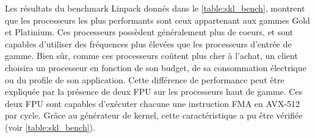         
        \begin{table}[h!]
        \centering
        \caption{Skylake portfolio: différences principales des SKUs}
        \label{table:skl}
        
        \end{table}
        
        
      Les résultats du benchmark Linpack donnés dans le \autoref{table:skl_bench}, montrent que les processeurs les plus performants sont ceux appartenant aux gammes Gold et Platinium. Ces processeurs possèdent généralement plus de coeurs, et sont capables d'utiliser des fréquences plus élevées que les processeurs d'entrée de gamme. Bien sûr, comme ces processeurs coûtent plus cher à l'achat, un client choisira un processeur en fonction de son budget, de sa consommation électrique ou du profile de son application. Cette différence de performance peut être expliquée par la présence de deux FPU sur les processeurs haut de gamme. Ces deux FPU sont capables d'exécuter chacune une instruction FMA en AVX-512 par cycle. Grâce au générateur de kernel, cette caractéristique a pu être vérifiée (voir \autoref{table:skl_bench}).

